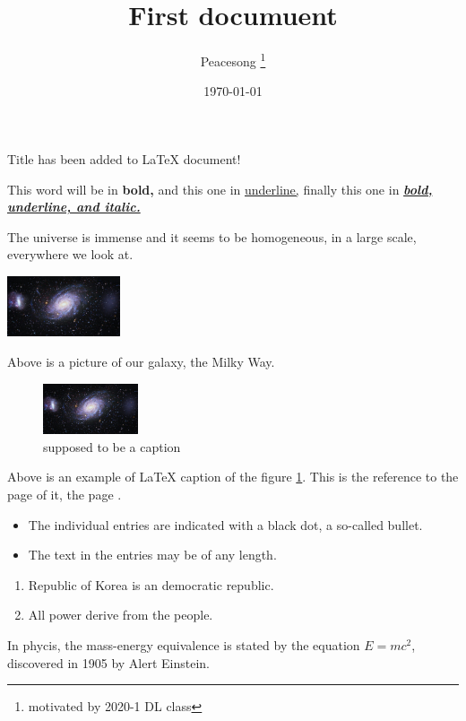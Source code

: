 \documentclass[12pt, a4paper]{report}
\title{First documuent}
\author{Peacesong \thanks{motivated by 2020-1 DL class}}
\date{\today}
\begin{document}
\maketitle

Title has been added to \LaTeX{} document!

This word will be in \textbf{bold,}
and this one in \underline{underline,}
finally this one in \textbf{\underline{\textit{bold, underline, and italic.}}}

The universe is immense and it seems to be homogeneous, in a large scale, everywhere we look at.

\includegraphics[width=0.25\textwidth]{galaxy}

Above is a picture of our galaxy, the Milky Way.

\begin{figure}[h]
  \centering
  \includegraphics[width=0.25\textwidth]{galaxy}
  \caption{supposed to be a caption}
  \label{fig:mesh1}
\end{figure}

Above is an example of LaTeX caption of the figure \ref{fig:mesh1}. This is the reference to the page of it, the page \pageref{fig:mesh1}.

\begin{itemize}
  \item The individual entries are indicated with a black dot, a so-called bullet.
  \item The text in the entries may be of any length.
\end{itemize}

\begin{enumerate}
  \item Republic of Korea is an democratic republic.
  \item All power derive from the people.
\end{enumerate}

In phycis, the mass-energy equivalence is stated by the equation $E=mc^2$, discovered in 1905 by Alert Einstein.
\end{document}
